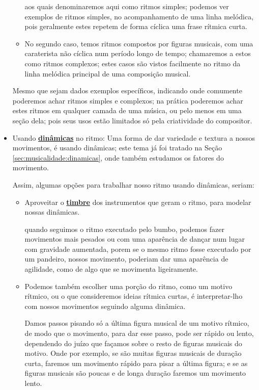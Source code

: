 \begin{itemize}
\begin{itemize}
aos quais denominaremos aqui como ritmos simples; podemos ver exemplos de ritmos simples,
no acompanhamento de uma linha melódica, 
pois geralmente estes repetem de forma cíclica uma frase rítmica curta.
\item No segundo caso, temos  ritmos compostos por figuras musicais,
com uma caraterista não cíclica num período longo de tempo; 
chamaremos a estos como ritmos complexos;
estes casos são vistos facilmente no ritmo da linha melódica principal de uma composição musical.
\end{itemize}
Mesmo que sejam dados exemplos específicos, 
indicando onde comumente poderemos achar ritmos simples e complexos;
na prática poderemos achar estes ritmos em qualquer camada de uma música,
ou pelo menos em uma seção dela; 
pois seus usos estão limitados só pela criatividade do compositor.
\item Usando \hyperref[sec:musicalidade:dinamicas]{\textbf{dinâmicas}} no ritmo: 
Uma forma de dar variedade e textura a nossos movimentos, 
é usando dinâmicas; este tema já foi tratado na Seção \ref{sec:musicalidade:dinamicas},
onde também estudamos os fatores do movimento.

Assim, algumas opções para trabalhar nosso ritmo usando dinâmicas, seriam:
\begin{itemize}
\item Aproveitar o \hyperref[sec:pos:timbre]{\textbf{timbre}} dos instrumentos que geram o ritmo,
para modelar nossas dinâmicas.
\begin{example}
quando seguimos  o ritmo executado pelo bumbo,
podemos fazer movimentos mais pesados ou com uma aparência de dançar num lugar com gravidade aumentada,
porem se o mesmo ritmo fosse executado por um pandeiro,
nossos movimento,
poderiam dar uma aparência de agilidade, 
como de algo que se movimenta ligeiramente.
\end{example}
\item Podemos também escolher uma porção do ritmo, como um motivo rítmico,
 ou o que consideremos ideias rítmica curtas,
é interpretar-lho com nossos movimentos seguindo alguma dinâmica.
\begin{example}
Damos passos pisando só a última figura musical de um motivo rítmico,
de modo que o movimento, para dar esse passo, pode ser rápido ou lento,
dependendo do juízo que façamos sobre o resto de figuras musicais do motivo.
Onde por exemplo, se são muitas figuras musicais de duração curta, 
faremos um movimento rápido para pisar a última figura;
e se as figuras musicais são poucas e de longa duração faremos um movimento lento.
\end{example}
\end{itemize}
\end{itemize}



